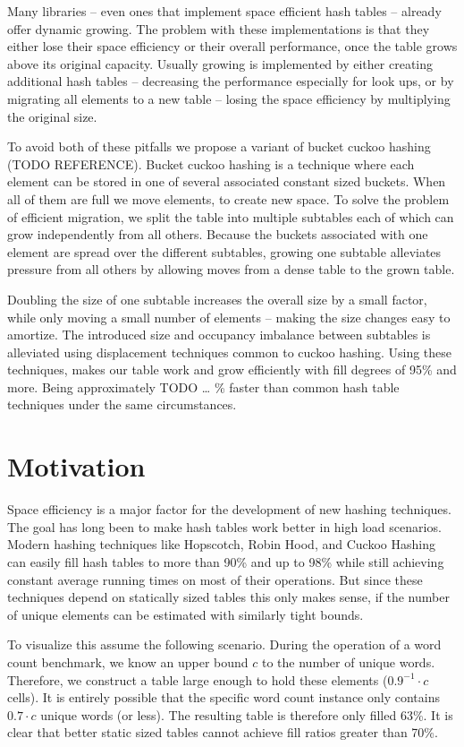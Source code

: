 \documentclass[a4paper,UKenglish]{lipics-v2016}
\begin{document}
Many libraries -- even ones that implement space efficient hash tables
-- already offer dynamic growing.  The problem with these
implementations is that they either lose their space efficiency or
their overall performance, once the table grows above its original
capacity.  Usually growing is implemented by either creating
additional hash tables -- decreasing the performance especially for
look ups, or by migrating all elements to a new table -- losing the
space efficiency by multiplying the original size.

To avoid both of these pitfalls we propose a variant of bucket cuckoo
hashing (TODO REFERENCE).  Bucket cuckoo hashing is a technique where
each element can be stored in one of several associated constant sized
buckets.  When all of them are full we move elements, to create new
space.  To solve the problem of efficient migration, we split the
table into multiple subtables each of which can grow independently
from all others.  Because the buckets associated with one element are
spread over the different subtables, growing one subtable alleviates
pressure from all others by allowing moves from a dense table to the
grown table.

Doubling the size of one subtable increases the overall size by a
small factor, while only moving a small number of elements -- making
the size changes easy to amortize. The introduced size and occupancy
imbalance between subtables is alleviated using displacement
techniques common to cuckoo hashing. Using these techniques, makes our
table work and grow efficiently with fill degrees of 95\% and more.
Being approximately TODO \ldots{} \% faster than common hash table
techniques under the same circumstances.

\section{Motivation}
\label{sec:motivation}
Space efficiency is a major factor for the development of new hashing
techniques.  The goal has long been to make hash tables work better in
high load scenarios.  Modern hashing techniques like Hopscotch, Robin
Hood, and Cuckoo Hashing can easily fill hash tables to more than 90\%
and up to 98\% while still achieving constant average running times on
most of their operations.  But since these techniques depend on
statically sized tables this only makes sense, if the number of unique
elements can be estimated with similarly tight bounds.

To visualize this assume the following scenario.  During the operation
of a word count benchmark, we know an upper bound $c$ to the number of
unique words. Therefore, we construct a table large enough to hold
these elements ($0.9^{-1}\cdot c$ cells).  It is entirely possible
that the specific word count instance only contains $0.7\cdot c$
unique words (or less).  The resulting table is therefore only filled
63\%.  It is clear that better static sized tables cannot achieve fill
ratios greater than 70\%.
\end{document}
